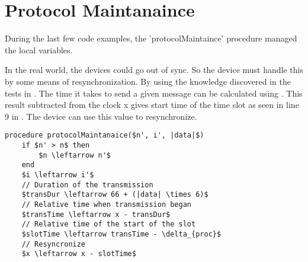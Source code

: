 \section{Protocol Maintanaince}
During the last few code examples, the 'protocolMaintaince' procedure managed the local variables. 


In the real world, the devices could go out of sync. 
So the  device must handle this by some means of resynchronization. 
By using the knowledge discovered in the tests in . 
The time it takes to send a given message can be calculated using . 
This result subtracted from the clock x gives start time of the time slot as seen in line 9 in . 
The device can use this value to resynchronize.

\begin{minipage}{\linewidth} %
\begin{lstlisting}[style=pseudocode, mathescape=true, label={lst:maintaniance}, caption={Pseudocode example of protocol maintaniance}] 
procedure protocolMaintanaice($n', i', |data|$)
	if $n' > n$ then
		$n \leftarrow n'$
	end
	$i \leftarrow i'$
	// Duration of the transmission
	$transDur \leftarrow 66 + (|data| \times 6)$
	// Relative time when transmission began
	$transTime \leftarrow x - transDur$
	// Relative time of the start of the slot
	$slotTime \leftarrow transTime - \delta_{proc}$
	// Resyncronize
	$x \leftarrow x - slotTime$
\end{lstlisting}  
\end{minipage}